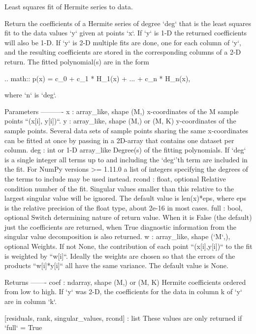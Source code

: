 \begin{DoxyVerb}Least squares fit of Hermite series to data.

Return the coefficients of a Hermite series of degree `deg` that is the
least squares fit to the data values `y` given at points `x`. If `y` is
1-D the returned coefficients will also be 1-D. If `y` is 2-D multiple
fits are done, one for each column of `y`, and the resulting
coefficients are stored in the corresponding columns of a 2-D return.
The fitted polynomial(s) are in the form

.. math::  p(x) = c_0 + c_1 * H_1(x) + ... + c_n * H_n(x),

where `n` is `deg`.

Parameters
----------
x : array_like, shape (M,)
    x-coordinates of the M sample points ``(x[i], y[i])``.
y : array_like, shape (M,) or (M, K)
    y-coordinates of the sample points. Several data sets of sample
    points sharing the same x-coordinates can be fitted at once by
    passing in a 2D-array that contains one dataset per column.
deg : int or 1-D array_like
    Degree(s) of the fitting polynomials. If `deg` is a single integer
    all terms up to and including the `deg`'th term are included in the
    fit. For NumPy versions >= 1.11.0 a list of integers specifying the
    degrees of the terms to include may be used instead.
rcond : float, optional
    Relative condition number of the fit. Singular values smaller than
    this relative to the largest singular value will be ignored. The
    default value is len(x)*eps, where eps is the relative precision of
    the float type, about 2e-16 in most cases.
full : bool, optional
    Switch determining nature of return value. When it is False (the
    default) just the coefficients are returned, when True diagnostic
    information from the singular value decomposition is also returned.
w : array_like, shape (`M`,), optional
    Weights. If not None, the contribution of each point
    ``(x[i],y[i])`` to the fit is weighted by ``w[i]``. Ideally the
    weights are chosen so that the errors of the products ``w[i]*y[i]``
    all have the same variance.  The default value is None.

Returns
-------
coef : ndarray, shape (M,) or (M, K)
    Hermite coefficients ordered from low to high. If `y` was 2-D,
    the coefficients for the data in column k  of `y` are in column
    `k`.

[residuals, rank, singular_values, rcond] : list
    These values are only returned if `full` = True


\end{DoxyVerb}
